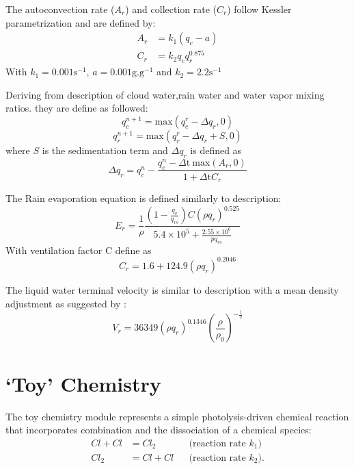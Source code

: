 \documentclass[times,doublespace]{fldauth}
\begin{document}
{\begin{appendix}
The autoconvection rate ($A_r$) and collection rate ($C_r$) follow Kessler parametrization and are defined by:
\begin{align}
A_r &= k_1(q_c-a) \\
C_r &= k_2q_cq_r^{0.875}
\end{align} With $k_1=0.001 \text{s}^{-1}$, $a=0.001 \text{g}.\text{g}^{-1}$ and $k_2=2.2 \text{s}^{-1}$ 

Deriving from \cite{klemp1978simulation} description of cloud water,rain water and water vapor mixing ratios. they are define as followed:
\begin{equation}
q_c^{n+1}=\mbox{max}(q_c^r-\Delta q_r,0)
\end{equation}
\begin{equation}
q_r^{n+1}=\mbox{max}(q_r^r-\Delta q_r+S,0)
\end{equation} where $S$ is the sedimentation term and $\Delta q_r$ is defined as
\begin{equation}
\Delta q_r=q_c^n-\frac{q_c^n-\Delta \text{t}\ \mbox{max}(A_r,0)}{1+\Delta \text{t} C_r}
\end{equation}

The Rain evaporation equation is defined similarly to \cite{ogura1971numerical} description:
\begin{equation}
E_r=\frac{1}{\rho}\frac{\left(1-\frac{q_v}{q_{vs}}\right)C(\rho q_r)^{0.525}}{5.4\times10^5+\frac{2.55\times10^6}{pq_{vs}}}
\end{equation}  With ventilation factor C define as 
\begin{equation}
C_r=1.6+124.9(\rho q_r)^{0.2046}
\label{venti}
\end{equation}

The liquid water terminal velocity is similar to \cite{soong1973comparison} description with a mean density adjustment as suggested by \cite{kessler1969distribution}:
\begin{equation}
V_r = 36349(\rho q_r)^{0.1346}\left(\frac{\rho}{\rho_0}\right)^{-\frac{1}{2}}
\end{equation}


\section{`Toy' Chemistry} \label{sec:ToyChemistry}

The toy chemistry module represents a simple photolysis-driven chemical reaction that incorporates combination and the dissociation of a chemical species:
\begin{align}
Cl + Cl &= Cl_2 && \mbox{(reaction rate $k_1$)}\\
Cl_2&=Cl+Cl && \mbox{(reaction rate $k_2$)}.
\end{align}


\end{appendix}}
\end{document}
